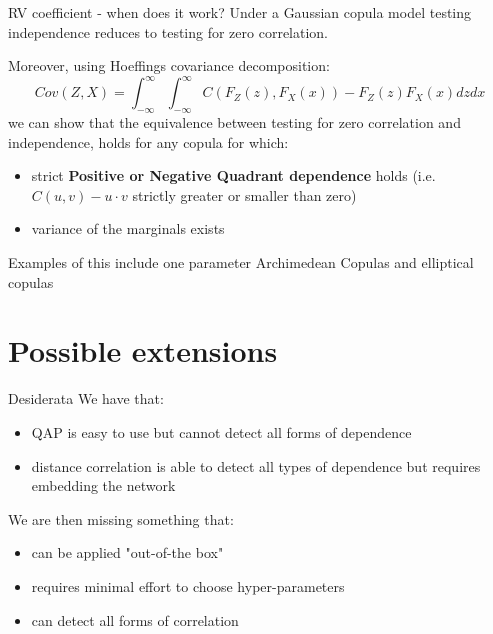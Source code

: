 \documentclass[10.5pt]{beamer}
\begin{document}
\begin{frame}{RV coefficient - when does it work?}
Under a Gaussian copula model testing independence reduces to testing for zero correlation. 
\vspace{.5em}

Moreover, using Hoeffings covariance decomposition:
\[
Cov(Z, X) = \int_{-\infty}^{\infty}\int_{-\infty}^{\infty} C(F_Z(z), F_X(x)) - F_Z(z)F_X(x) dz dx
\]
we can show that the equivalence between testing for zero correlation and independence, holds for any copula for which:
\begin{itemize}
    \item strict \textbf{Positive or Negative Quadrant dependence} holds (i.e. $C(u, v) - u \cdot v$ strictly greater or smaller than zero) 
    \item variance of the marginals exists
\end{itemize}
\vspace{.5em}

Examples of this include one parameter Archimedean Copulas and elliptical copulas
\end{frame}

\section{Possible extensions}
\begin{frame}{Desiderata}
We have that:
\begin{itemize}
    \item QAP is easy to use but cannot detect all forms of dependence
    \item distance correlation is able to detect all types of dependence but requires embedding the network
\end{itemize}
\vspace{.5em}

We are then missing something that:
\begin{itemize}
    \item can be applied "out-of-the box"
    \item requires minimal effort to choose hyper-parameters
    \item can detect all forms of correlation
\end{itemize}
\end{frame}
\end{document}
